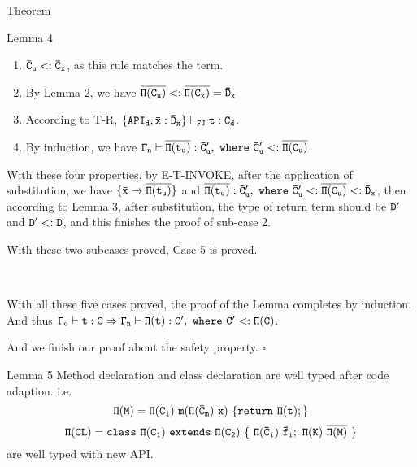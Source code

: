 \documentclass[GBK,winfonts,a4paper,11pt]{article}
\begin{document}
\begin{section}{Theorem}
\begin{subsection}{Lemma 4}
\begin{enumerate}
\item $\tt\bar{C}_u<:\bar{C}_x$, as this rule matches the term.
\item By Lemma 2, we have $\tt \overline{\Pi(C_u)} <: \overline{\Pi(C_x)} = \bar{D}_x$
\item According to T-R, $\tt \{API_d, \bar{x}:\bar{D}_x\}\vdash_{FJ}t:C_d$.
\item By induction, we have $\tt \Gamma_n\vdash\overline{\Pi(t_u)}:\bar{C}'_u,\ where\ \bar{C}'_u <:\overline{\Pi(C_u)}$
\end{enumerate}
With these four properties, by E-T-INVOKE, after the application of substitution, we have
$\tt \{\bar{x}\rightarrow\overline{\Pi(t_u)}\}$ and $\tt \overline{\Pi(t_u)}:\bar{C}'_u,\ where\ \bar{C}'_u <: \overline{\Pi(C_u)}<:\bar{D}_x$, 
then according to Lemma 3, after substitution, the type of return term should be $\tt D'$ and $\tt D' <: D$, and this finishes the proof of sub-case 2.
\par
With these two subcases proved, Case-5 is proved.

\par
\ 
\par
With all these five cases proved, the proof of the Lemma completes by induction. And thus $\tt \Gamma_o\vdash t:C \Rightarrow \Gamma_n\vdash \Pi(t):C',\ where\ C'<:\Pi(C)$.
\par
And we finish our proof about the safety property. \quad$\square$
\end{subsection}

\begin{subsection}{Lemma 5}
Method declaration and class declaration are well typed after code adaption. i.e.
 $$\tt\Pi(M)=\Pi(C_1)\ m(\Pi(\bar{C}_m)\ \bar{x})\ \{return\ \Pi(t);\}$$
 $$\tt \Pi(CL)= class\ \Pi(C_1)\ extends\ \Pi(C_2)\ \{\ \Pi(\bar{C}_i)\ \bar{f}_i;\ \Pi(K)\  \overline{\Pi(M)}\ \}$$
are well typed with new API.

\end{subsection}
\end{section}
\end{document}
